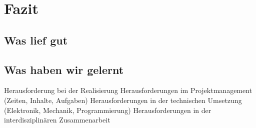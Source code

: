 \chapter{Fazit}

\section{Was lief gut}

\section{Was haben wir gelernt}
    Herausforderung bei der Realisierung
        Herausforderungen im Projektmanagement (Zeiten, Inhalte, Aufgaben)
        Herausforderungen in der technischen Umsetzung (Elektronik, Mechanik, Programmierung)
        Herausforderungen in der interdisziplinären Zusammenarbeit

